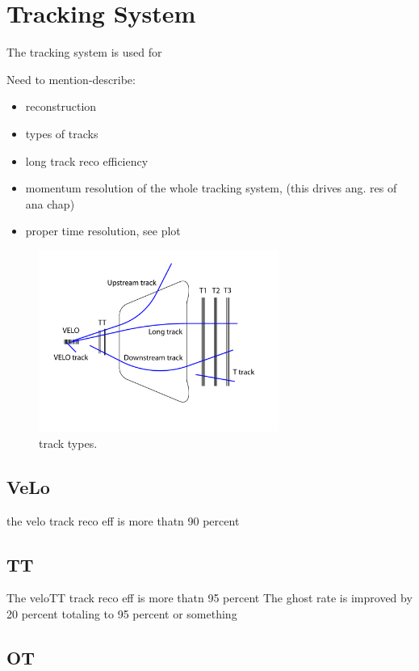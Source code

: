 \section{Tracking System}
\label{det_tracking}

The tracking system is used for

Need to mention-describe:
\begin{itemize}
  \item reconstruction
  \item types of tracks
  \item long track reco efficiency
  \item momentum resolution of the whole tracking system, (this drives ang. res of ana chap)
  \item proper time resolution, see plot
\end{itemize}

\begin{figure}[t]
  \centering
  \includegraphics[width=0.7\textwidth]{Figures/Chapter2/trackTypesRunIAndII}
  \caption{\lhcb track types.}
  \label{track_types}
\end{figure}

\subsection{VeLo}
the velo track reco eff is more thatn 90 percent

\subsection{TT}
The veloTT track reco eff is more thatn 95 percent
The ghost rate is improved by 20 percent totaling to 95 percent or something

\subsection{OT}

